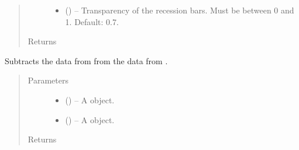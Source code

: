 \documentclass[letterpaper,10pt,openany,oneside,english]{sphinxmanual}
\begin{document}
\begin{fulllineitems}
\begin{quote}
\begin{description}
\begin{itemize}
\item {} 
 (\href{https://docs.python.org/2/library/functions.html\#float}{}) -- Transparency of the recession bars. Must be between 0 and 1. Default: 0.7.

\end{itemize}

\item[{Returns}] \leavevmode


\end{description}\end{quote}

\end{fulllineitems}


\begin{fulllineitems}
\label{\detokenize{additional_functions:fredpy.minus}}
Subtracts the data from  from the data from .
\begin{quote}\begin{description}
\item[{Parameters}] \leavevmode\begin{itemize}
\item {} 
 ({\hyperref[\detokenize{series_class:fredpy.series}]{}}) -- A {\hyperref[\detokenize{series_class:fredpy.series}]{}} object.

\item {} 
 ({\hyperref[\detokenize{series_class:fredpy.series}]{}}) -- A {\hyperref[\detokenize{series_class:fredpy.series}]{}} object.

\end{itemize}

\item[{Returns}] \leavevmode
{\hyperref[\detokenize{series_class:fredpy.series}]{}}

\end{description}\end{quote}

\end{fulllineitems}
\end{document}
